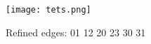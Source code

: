 \documentclass[a4paper,12pt]{article}
\begin{document}
\texttt{[image: tets.png]}

Refined edges: 01 12 20 23 30 31
\end{document}
